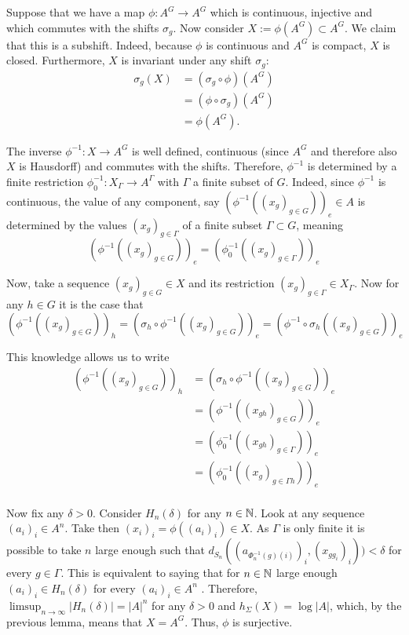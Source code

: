 Suppose that we have a map $\phi: A^G \to A^G$ which is continuous, injective and which commutes with the shifts $\sigma_g$. Now consider $X := \phi(A^G) \subset A^G$. We claim that this is a subshift. Indeed, because $\phi$ is continuous and $A^G$ is compact, $X$ is closed. Furthermore, $X$ is invariant under any shift $\sigma_g$: 
		\begin{align*}
		\sigma_g(X)
		&= (\sigma_g \circ \phi) (A^G) \\
		&= (\phi \circ \sigma_g)(A^G) \\
		&= \phi(A^G).
		\end{align*}
		
The inverse $\phi^{-1}: X \to A^G$ is well defined, continuous (since $A^G$ and therefore also $X$ is Hausdorff) and commutes with the shifts. Therefore,  $\phi^{-1}$ is determined by a finite restriction $\phi^{-1}_0: X_{\Gamma} \to A^{\Gamma}$ with $\Gamma$ a finite subset of $G$. Indeed, since $\phi^{-1}$ is continuous, the value of any component, say $(\phi^{-1}((x_g)_{g \in G}))_e \in A$ is determined by the values $(x_g)_{g \in \Gamma}$ of a finite subset $\Gamma \subset G$, meaning 
		\[
		(\phi^{-1}((x_g)_{g \in G}))_e = (\phi^{-1}_0((x_g)_{g \in \Gamma}))_e
		\]

Now, take a sequence $(x_g)_{g \in G} \in X$ and its restriction $(x_g)_{g \in \Gamma} \in X_{\Gamma}$. Now for any $h \in G$ it is the case that 
		\[
		(\phi^{-1}((x_g)_{g \in G}))_h = (\sigma_h \circ \phi^{-1}((x_g)_{g \in G}))_e  = (\phi^{-1} \circ \sigma_h((x_g)_{g \in G}))_e
		\]

This knowledge allows us to write
		\begin{align*}
		(\phi^{-1}((x_g)_{g \in G}))_h
		&= (\sigma_h \circ \phi^{-1}((x_g)_{g \in G}))_e \\
		&= (\phi^{-1}((x_{gh})_{g \in G}))_e \\
		&= (\phi^{-1}_0((x_{gh})_{g \in \Gamma}))_e \\
		&= (\phi^{-1}_0((x_g)_{g \in \Gamma h}))_e
		\end{align*}
\\
Now fix any $\delta > 0$. Consider $H_n(\delta)$ for any $n \in \mathbb{N}$. Look at any sequence $(a_i)_i \in A^n$. Take then $(x_i)_i = \phi((a_i)_i) \in X$. As $\Gamma$ is only finite it is possible to take $n$ large enough such that $d_{S_n}((a_{\Phi^{-1}_n(g)(i)})_i,(x_{g g_i})_i)) < \delta$ for every $g \in \Gamma$. This is equivalent to saying that for $n \in \mathbb{N}$ large enough $(a_i)_i \in H_n(\delta)$ for every $(a_i)_i \in A^n$ . Therefore, $\limsup_{n \to \infty} |H_n(\delta)| = |A|^{n}$ for any $\delta >0$ and $h_\Sigma(X) = \log |A|$, which, by the previous lemma, means that $X = A^G$. Thus, $\phi$ is surjective.

